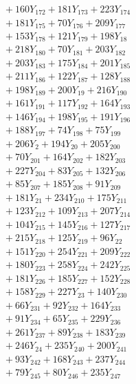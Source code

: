 \documentclass[a4paper,10pt]{article}
\begin{document}
{\begin{align}
&\quad  + 160Y_{172} + 181Y_{173} + 223Y_{174} \\[0.5ex]
&\quad  + 181Y_{175} + 70Y_{176} + 209Y_{177} \\[0.5ex]
&\quad  + 153Y_{178} + 121Y_{179} + 198Y_{18} \\[0.5ex]
&\quad  + 218Y_{180} + 70Y_{181} + 203Y_{182} \\[0.5ex]
&\quad  + 203Y_{183} + 175Y_{184} + 201Y_{185} \\[0.5ex]
&\quad  + 211Y_{186} + 122Y_{187} + 128Y_{188} \\[0.5ex]
&\quad  + 198Y_{189} + 200Y_{19} + 216Y_{190} \\[0.5ex]
&\quad  + 161Y_{191} + 117Y_{192} + 164Y_{193} \\[0.5ex]
&\quad  + 146Y_{194} + 198Y_{195} + 191Y_{196} \\[0.5ex]
&\quad  + 188Y_{197} + 74Y_{198} + 75Y_{199} \\[0.5ex]
&\quad  + 206Y_{2} + 194Y_{20} + 205Y_{200} \\[0.5ex]
&\quad  + 70Y_{201} + 164Y_{202} + 182Y_{203} \\[0.5ex]
&\quad  + 227Y_{204} + 83Y_{205} + 132Y_{206} \\[0.5ex]
&\quad  + 85Y_{207} + 185Y_{208} + 91Y_{209} \\[0.5ex]
&\quad  + 181Y_{21} + 234Y_{210} + 175Y_{211} \\[0.5ex]
&\quad  + 123Y_{212} + 109Y_{213} + 207Y_{214} \\[0.5ex]
&\quad  + 104Y_{215} + 145Y_{216} + 127Y_{217} \\[0.5ex]
&\quad  + 215Y_{218} + 125Y_{219} + 96Y_{22} \\[0.5ex]
&\quad  + 151Y_{220} + 254Y_{221} + 209Y_{222} \\[0.5ex]
&\quad  + 180Y_{223} + 258Y_{224} + 242Y_{225} \\[0.5ex]
&\quad  + 181Y_{226} + 185Y_{227} + 152Y_{228} \\[0.5ex]
&\quad  + 158Y_{229} + 227Y_{23} + 140Y_{230} \\[0.5ex]
&\quad  + 66Y_{231} + 92Y_{232} + 164Y_{233} \\[0.5ex]
&\quad  + 91Y_{234} + 65Y_{235} + 229Y_{236} \\[0.5ex]
&\quad  + 261Y_{237} + 89Y_{238} + 183Y_{239} \\[0.5ex]
&\quad  + 246Y_{24} + 235Y_{240} + 200Y_{241} \\[0.5ex]
&\quad  + 93Y_{242} + 168Y_{243} + 237Y_{244} \\[0.5ex]
&\quad  + 79Y_{245} + 80Y_{246} + 235Y_{247} \\[0.5ex]

\end{align}}
\end{document}
